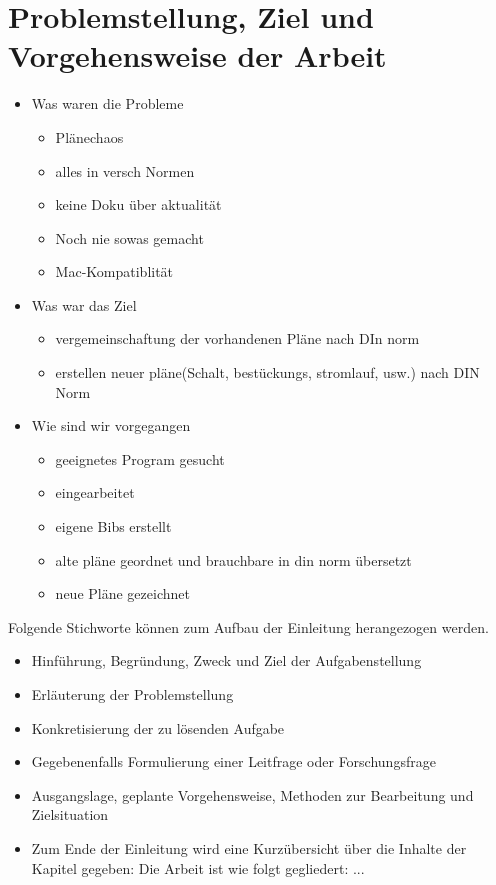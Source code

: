 \chapter{Problemstellung, Ziel und Vorgehensweise der Arbeit}
\label{cha:Problemstellung, Ziel und Vorgehensweise der Arbeit}



\begin{itemize}
	\item Was waren die Probleme
		\begin{itemize}
		\item Plänechaos
		\item alles in versch Normen
		\item keine Doku über aktualität
		\item Noch nie sowas gemacht
		\item Mac-Kompatiblität
	\end{itemize}
	\item Was war das Ziel
			\begin{itemize}
		\item vergemeinschaftung der vorhandenen Pläne nach DIn norm
		\item erstellen neuer pläne(Schalt, bestückungs, stromlauf, usw.) nach DIN Norm
	\end{itemize}
	\item Wie sind wir vorgegangen
		\begin{itemize}
		\item geeignetes Program gesucht
		\item eingearbeitet
		\item eigene Bibs erstellt
		\item alte pläne geordnet und brauchbare in din norm übersetzt
		\item neue Pläne gezeichnet
	\end{itemize}

\end{itemize}
Folgende Stichworte können zum Aufbau der Einleitung herangezogen werden.

\begin{itemize}
\item Hinführung, Begründung, Zweck und Ziel der Aufgabenstellung
\item Erläuterung der Problemstellung
\item Konkretisierung der zu lösenden Aufgabe
\item Gegebenenfalls Formulierung einer Leitfrage oder Forschungsfrage
\item Ausgangslage, geplante Vorgehensweise, Methoden zur Bearbeitung und Zielsituation
\item Zum Ende der Einleitung wird eine Kurzübersicht über die Inhalte der Kapitel gegeben: \glqq Die Arbeit ist wie folgt gegliedert: ...\grqq
\end{itemize}

